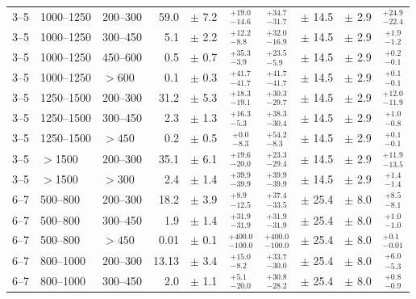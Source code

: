 \begin{table}[!hp]
{\begin{tabular}{lll|rc|cccc|c}
      3--5   & 1000--1250  & 200--300 & 59.0  & $\pm$  7.2  & $^{+19.0}_{-14.6}$ & $^{+34.7}_{-31.7}$ & $\pm$  14.5   & $\pm$ 2.9 & $^{+24.9}_{-22.4}$\\
      3--5   & 1000--1250  & 300--450 & 5.1   & $\pm$  2.2  & $^{+12.2}_{-8.8}$ & $^{+32.0}_{-16.9}$ & $\pm$  14.5   & $\pm$ 2.9 & $^{+1.9}_{-1.2}$ \\
      3--5   & 1000--1250  & 450--600 & 0.5   & $\pm$  0.7  & $^{+35.3}_{-3.9}$ & $^{+23.5}_{-5.9}$ &  $\pm$  14.5   & $\pm$ 2.9 & $^{+0.2}_{-0.1}$ \\
      3--5   & 1000--1250  & $>600$  & 0.1   & $\pm$  0.3  & $^{+41.7}_{-41.7}$ & $^{+41.7}_{-41.7}$ & $\pm$ 14.5   &  $\pm$ 2.9 & $^{+0.1}_{-0.1}$ \\
      \midrule
      3--5   & 1250--1500  & 200--300 & 31.2  & $\pm$  5.3  & $^{+18.3}_{-19.1}$ & $^{+30.3}_{-29.7}$ & $\pm$  14.5  & $\pm$ 2.9 & $^{+12.0}_{-11.9}$\\
      3--5   & 1250--1500  & 300--450 & 2.3   & $\pm$  1.3  & $^{+16.3}_{-5.3}$ & $^{+38.3}_{-30.4}$ & $\pm$  14.5  & $\pm$ 2.9 & $^{+1.0}_{-0.8}$ \\
      3--5   & 1250--1500  & $>450$  & 0.2   & $\pm$  0.5  & $^{+0.0}_{-8.3}$ & $^{+54.2}_{-8.3}$  & $\pm$   14.5 & $\pm$ 2.9 & $^{+0.1}_{-0.1}$  \\
      \midrule
      3--5   & $>$1500    & 200--300 & 35.1  & $\pm$  6.1  & $^{+19.6}_{-20.0}$ & $^{+23.3}_{-29.4}$ & $\pm$   14.5 & $\pm$ 2.9 & $^{+11.9}_{-13.5}$ \\
      3--5   & $>$1500    & $>300$  & 2.4   & $\pm$  1.4  & $^{+39.9}_{-39.9}$ & $^{+39.9}_{-39.9}$ & $\pm$   14.5 & $\pm$ 2.9 & $^{+1.4}_{-1.4}$ \\
      \midrule 
      \midrule
      6--7   & 500--800   & 200--300  &  18.2 & $\pm$  3.9  & $^{+8.9}_{-12.5}$ & $^{+37.4}_{-33.5}$ & $\pm$  25.4  & $\pm$ 8.0 & $^{+8.5}_{-8.1}$  \\
      6--7   & 500--800   & 300--450  &  1.9  & $\pm$  1.4  & $^{+31.9}_{-31.9}$ & $^{+31.9}_{-31.9}$ & $\pm$  25.4 & $\pm$ 8.0 & $^{+1.0}_{-1.0}$  \\
      6--7   & 500--800   & $>450$   &  0.01 & $\pm$  0.1  & $^{+400.0}_{-100.0}$ & $^{+400.0}_{-100.0}$ & $\pm$  25.4 & $\pm$ 8.0 & $^{+0.1}_{-0.01}$\\
      \midrule
      6--7   & 800--1000  & 200--300  &  13.13& $\pm$  3.4  & $^{+15.0}_{-8.2}$ & $^{+33.7}_{-30.0}$ & $\pm$  25.4  & $\pm$ 8.0 & $^{+6.0}_{-5.3}$  \\
      6--7   & 800--1000  & 300--450  &  2.0  & $\pm$  1.1  & $^{+5.1}_{-20.0}$ & $^{+30.8}_{-28.2}$ & $\pm$  25.4  & $\pm$ 8.0 & $^{+0.8}_{-0.9}$  \\

\end{tabular}}
\end{table}
